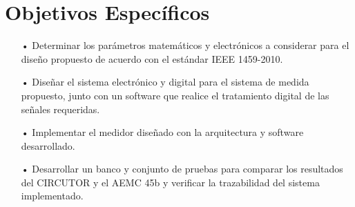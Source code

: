 \section{Objetivos Específicos}
\begin{itemize}
\item[•]Determinar los parámetros matemáticos y electrónicos a considerar para el diseño propuesto de acuerdo con el estándar IEEE 1459-2010.

\item[•]	Diseñar el sistema electrónico y digital para el sistema de medida propuesto, junto con un software que realice el tratamiento digital de las señales requeridas.

\item[•] Implementar el medidor diseñado con la arquitectura y software desarrollado.

\item[•] Desarrollar un banco y conjunto de pruebas para comparar los resultados del CIRCUTOR y el AEMC 45b y verificar la trazabilidad del sistema implementado.

\end{itemize}



